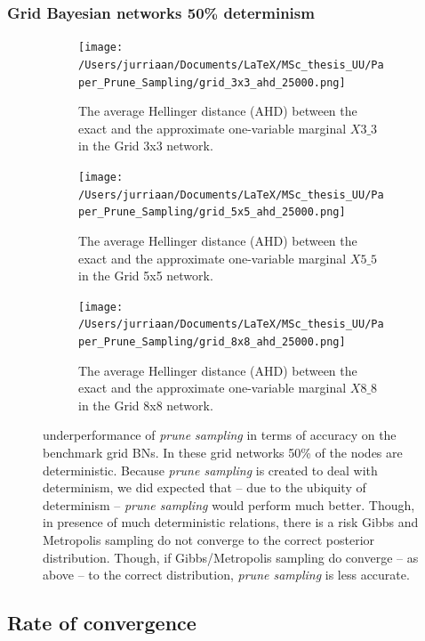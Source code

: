 \documentclass[a4paper, twoside, 11pt]{report}
\theoremstyle{plain}
\theoremstyle{definition}
\theoremstyle{remark}
\newcommand{\ps}{\textit{prune sampling }}
\begin{document}
\subsubsection{Grid Bayesian networks 50\% determinism}
\begin{figure}[H]
\centering
\begin{subfigure}{0.49\textwidth}
\texttt{[image: /Users/jurriaan/Documents/LaTeX/MSc\_thesis\_UU/Paper\_Prune\_Sampling/grid\_3x3\_ahd\_25000.png]}
\caption{The average Hellinger distance (AHD) between the exact and the approximate one-variable marginal $X 3\_3$ in the Grid 3x3 network. }%
\label{grid_3x3}%
\end{subfigure}\hfill%
\begin{subfigure}{0.49\textwidth}
\texttt{[image: /Users/jurriaan/Documents/LaTeX/MSc\_thesis\_UU/Paper\_Prune\_Sampling/grid\_5x5\_ahd\_25000.png]}
\caption{The average Hellinger distance (AHD) between the exact and the approximate one-variable marginal $X 5\_5$ in the Grid 5x5 network.}%
\label{grid_5x5}%
\end{subfigure}
\begin{subfigure}{0.49\textwidth}
\texttt{[image: /Users/jurriaan/Documents/LaTeX/MSc\_thesis\_UU/Paper\_Prune\_Sampling/grid\_8x8\_ahd\_25000.png]}
\caption{The average Hellinger distance (AHD) between the exact and the approximate one-variable marginal $X 8\_8$ in the Grid 8x8 network.}%
\label{grid_8x8}%
\end{subfigure}\hfill%
\caption{underperformance of \ps in terms of accuracy on the benchmark grid BNs. In these grid networks 50\% of the nodes are deterministic. Because \ps is created to deal with determinism, we did expected that -- due to the ubiquity of determinism -- \ps would perform much better. Though, in presence of much deterministic relations, there is a risk Gibbs and Metropolis sampling do not converge to the correct posterior distribution. Though, if Gibbs/Metropolis sampling do converge -- as above -- to the correct distribution, \ps is less accurate.}
\label{results1}
\end{figure}


\subsection{Rate of convergence}
\end{document}

